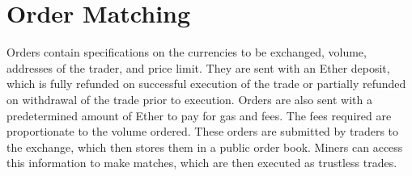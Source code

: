 \documentclass[a4paper]{article}
\begin{document}
        \begin{small}
        \begin{center}
        \end{center}
        \end{small}
\section*{Order Matching}
	Orders contain specifications on
    the currencies to be exchanged, volume, addresses of the trader,
    and price limit. They are sent with an Ether deposit, which is fully
    refunded on successful execution of the trade or partially refunded on
    withdrawal of the trade prior to execution. Orders are also sent with
    a predetermined amount of Ether to pay for gas and fees. The fees required are proportionate to the volume ordered. These orders
    are submitted by traders to the exchange, which then stores them in a
    public order book. Miners can access this information to make matches,
    which are then executed as trustless trades.
\end{document}
